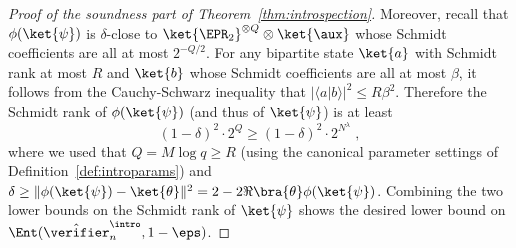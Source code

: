 \begin{proof}[Proof of the soundness part of Theorem~\ref{thm:introspection}]
  Moreover, recall that $\phi(\ket{\psi})$ is $\delta$-close to
  $\ket{\EPR_2}^{\otimes Q} \otimes \ket{\aux}$ whose Schmidt coefficients are
  all at most $2^{-Q/2}$.
  For any bipartite state $\ket{a}$ with Schmidt rank at most $R$ and $\ket{b}$
  whose Schmidt coefficients are all at most $\beta$, it follows from the
  Cauchy-Schwarz inequality that $|\langle a | b \rangle|^2 \leq R \beta^2$.
  Therefore the Schmidt rank of $\phi(\ket{\psi})$ (and thus of $\ket{\psi}$) is
  at least
  \[
  	\left (1 - \delta \right)^2 \cdot 2^{Q} \geq \left
      (1 - \delta \right)^2 \cdot 2^{N^\lambda}\;,
  \]
  where we used that $Q = M \log q \geq R$ (using the canonical parameter
  settings of Definition~\ref{def:introparams}) and $\delta \geq \|
  \phi(\ket{\psi}) - \ket{\theta} \|^2 = 2 - 2\Re \bra{\theta}
  \phi(\ket{\psi})$.
  Combining the two lower bounds on the Schmidt rank of $\ket{\psi}$ shows the
  desired lower bound on $\Ent(\tvint_n,1 - \eps)$.
\end{proof}

 
